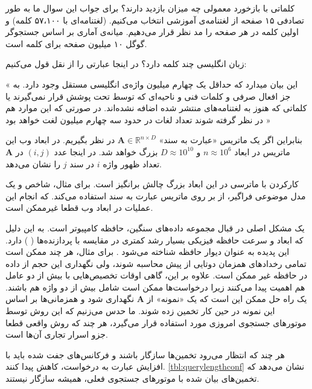 \begin{itemize}
کلماتی با بازخورد معمولی چه میزان بازدید دارند؟ برای جواب این سوال ما به طور تصادفی ۱۵ صفحه از لغتنامه‌‌ی آموزشی انتخاب می‌کنیم.
\cite{litez94}
(لغتنامه‌ای با ۵۷،۱۰۰ کلمه) و اولین کلمه در هر صفحه را مد نظر قرار می‌دهیم. میانه‌ی آماری بر اساس جستجو‌گر گوگل ۱۰ میلیون صفحه برای کلمه است.

زبان انگلیسی چند کلمه دارد؟ در اینجا عبارتی را از 
نقل قول می‌کنیم:

« این بیان میدارد که حداقل یک چهارم میلیون واژه‌ی انگلیسی مستقل وجود دارد. به جز افعال صرفی و کلمات فنی و ناحیه‌ای که توسط 
تحت پوشش قرار نمی‌گیرند یا کلماتی که هنوز به لغتنامه‌های منتشر شده اضافه نشده‌اند. در صورتی که این موارد هم در نظر گرفته شوند تعداد لغات در حدود سه چهارم میلیون لغت خواهد بود »

بنابراین اگر یک ماتریس «عبارت به سند» 
$\mathbf{A} \in \mathbb{R}^{n \times D}$
در نظر بگیریم. در ابعاد وب این ماتریس در ابعاد 
$n \approx 10^6$
و 
$D \approx 10^10$
بزرگ خواهد شد.
در اینجا عدد 
$(i,j)$
در 
$\mathbf{A}$
تعداد ظهور واژه 
$i$
در سند 
$j$
را نشان می‌دهد.

کارکردن با ماترسی در این ابعاد بزرگ چالش برانگیز است. برای مثال، شاخص 
\cite{litez58}
و یک مدل موضوعی فراگیر، از 
بر روی ماتریس عبارت به سند استفاده می‌کند. که انجام این عملیات در ابعاد وب قطعا غیرممکن است.

یک مشکل اصلی در قبال مجموعه داده‌های سنگین، حافظه کامپیوتر است. به این دلیل که ابعاد و سرعت حافظه فیزیکی بسیار رشد کمتری در مقایسه با پردازنده‌ها (
) دارد. این پدیده به عنوان دیوار حافظه شناخته می‌شود
\cite{litez139, litez168}
. برای مثال،‌ هر چند ممکن است تمامی رخداد‌های همزمان دوتایی از پیش محاسبه شوند، ولی نگهداری این حجم از داده در حافظه غیر ممکن است. علاوه بر این، گاهی اوقات تخصیص‌‌هایی با بیش از دو عامل هم اهمیت پیدا می‌کنند زیرا درخواست‌ها ممکن است شامل بیش از دو واژه هم باشند. یک راه حل ممکن این است که یک «نمونه» از 
$\mathbf{A}$
 نگهداری شود و همزمانی‌ها بر اساس این نمونه در حین کار تخمین زده شوند. ما حدس می‌زنیم که این روش توسط موتورهای جستجوی امروزی مورد استفاده قرار می‌گیرد، هر چند که روش واقعی قطعا جزو اسرار تجاری آن‌ها است.

هر چند که انتظار می‌رود تخمین‌ها سازگار باشند و فرکانس‌های جفت شده باید با افزایش عبارت به درخواست، کاهش پیدا کنند. 
\ref{tbl:querylengthconf}
نشان می‌دهد که تخمین‌های بیان شده با موتورهای جستجوی فعلی، همیشه سازگار نیستند.





\end{itemize}
